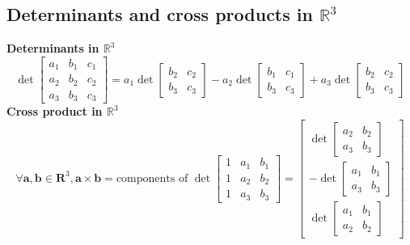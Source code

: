 \documentclass{article}
\begin{document}
\subsection*{Determinants and cross products in $\mathbb{R}^3$}
\textbf{Determinants in $\mathbb{R}^3$}
\begin{equation*}
    \det \begin{bmatrix}
        a_1& b_1& c_1\\
        a_2& b_2& c_2\\
        a_3& b_3& c_3
    \end{bmatrix} = a_1 \det \begin{bmatrix}
        b_2& c_2\\
        b_3& c_3
    \end{bmatrix} - a_2 \det \begin{bmatrix}
        b_1& c_1\\
        b_3& c_3
    \end{bmatrix} + a_3 \det \begin{bmatrix}
        b_2& c_2\\
        b_3& c_3
    \end{bmatrix}
\end{equation*}
\textbf{Cross product in $\mathbb{R}^3$}
\begin{equation*}
    \forall \mathbf{a, b} \in \mathbf{R}^3, \mathbf{a \times b} = \textrm{components of } \det \begin{bmatrix}
        1& a_1& b_1\\
        1& a_2& b_2\\
        1& a_3& b_3
    \end{bmatrix} = \begin{bmatrix}
        \det \begin{bmatrix}
            a_2& b_2\\
            a_3& b_3
        \end{bmatrix}\\
        -\det \begin{bmatrix}
            a_1& b_1\\
            a_3& b_3
        \end{bmatrix}\\
        \det \begin{bmatrix}
            a_1& b_1\\
            a_2& b_2
        \end{bmatrix}
    \end{bmatrix}
\end{equation*}
\end{document}
